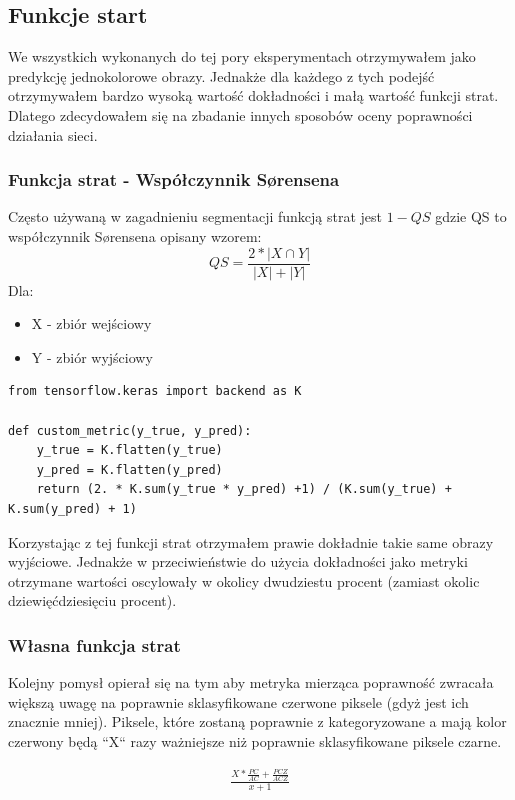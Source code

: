 \documentclass{article}
\begin{document}
\subsection{Funkcje start}
We wszystkich wykonanych do tej pory eksperymentach otrzymywałem jako predykcję jednokolorowe obrazy.
Jednakże dla każdego z tych podejść otrzymywałem bardzo wysoką wartość dokładności i małą wartość funkcji strat.
Dlatego zdecydowałem się na zbadanie innych sposobów oceny poprawności działania sieci.
\subsubsection{Funkcja strat - Współczynnik Sørensena}
Często używaną w zagadnieniu segmentacji funkcją strat jest $1-QS$ gdzie QS to współczynnik Sørensena opisany wzorem:
\begin{equation}
    QS = \frac{2*|X \cap Y|}{|X|+|Y|}
\end{equation}
Dla:
\begin{itemize}
    \item X - zbiór wejściowy
    \item Y - zbiór wyjściowy
\end{itemize}

\begin{lstlisting}[caption={Implementacja przy użyciu Keras i TensorFlow}]
from tensorflow.keras import backend as K

def custom_metric(y_true, y_pred):
    y_true = K.flatten(y_true)
    y_pred = K.flatten(y_pred)
    return (2. * K.sum(y_true * y_pred) +1) / (K.sum(y_true) + K.sum(y_pred) + 1)
\end{lstlisting}

Korzystając z tej funkcji strat otrzymałem prawie dokładnie takie same obrazy wyjściowe.
Jednakże w przeciwieństwie do użycia dokładności jako metryki otrzymane wartości oscylowały w okolicy dwudziestu procent (zamiast okolic dziewięćdziesięciu procent).

\subsubsection{Własna funkcja strat}
Kolejny pomysł opierał się na tym aby metryka mierząca poprawność zwracała większą uwagę na poprawnie sklasyfikowane czerwone piksele (gdyż jest ich znacznie mniej).
Piksele, które zostaną poprawnie z kategoryzowane a mają kolor czerwony będą ``X`` razy ważniejsze niż poprawnie sklasyfikowane piksele czarne.

\begin{align}
    \frac{X*\frac{PC}{AC} + \frac{PCZ}{ACZ}}{x+1}
\end{align}
\end{document}
